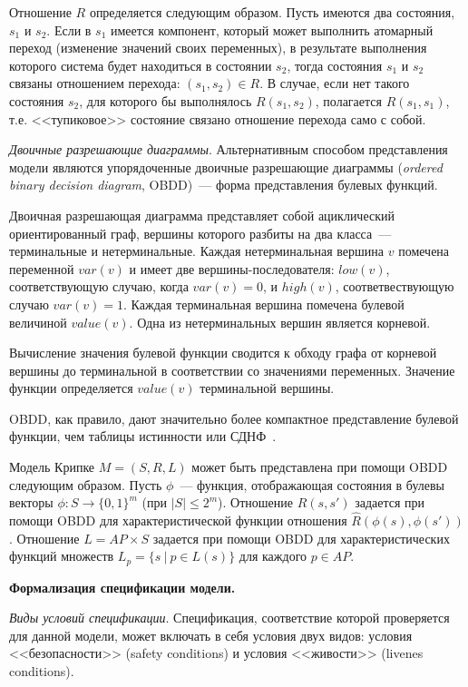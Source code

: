 \documentclass[a4paper,notitlepage,14pt]{article}
\begin{document}
Отношение $R$ определяется следующим образом. Пусть имеются два состояния, $s_1$ и
$s_2$. Если в $s_1$ имеется компонент, который может выполнить атомарный переход
(изменение значений своих переменных), в результате выполнения которого система будет
находиться в состоянии $s_2$, тогда состояния $s_1$ и $s_2$ связаны отношением перехода:
$(s_1, s_2) \in R$. В случае, если нет такого состояния $s_2$, для которого бы выполнялось
$R(s_1, s_2)$, полагается $R(s_1, s_1)$, т.е. <<тупиковое>> состояние связано отношение
перехода само с собой.

\textit{Двоичные разрешающие диаграммы}. Альтернативным способом представления модели
являются упорядоченные двоичные разрешающие диаграммы (\emph{ordered binary decision
  diagram}, OBDD)\cite{Clarke}~--- форма представления булевых функций.

Двоичная разрешающая диаграмма представляет собой ациклический ориентированный граф,
вершины которого разбиты на два класса~--- терминальные и нетерминальные. Каждая
нетерминальная вершина $v$ помечена переменной $var(v)$ и имеет две вершины-последователя:
$low(v)$, соответствующую случаю, когда $var(v) = 0$, и $high(v)$, соответвествующую
случаю $var(v) = 1$. Каждая терминальная вершина помечена булевой величиной
$value(v)$. Одна из нетерминальных вершин является корневой.

Вычисление значения булевой функции сводится к обходу графа от корневой вершины до
терминальной в соответствии со значениями переменных. Значение функции определяется
$value(v)$ терминальной вершины. 

OBDD, как правило, дают значительно более компактное представление булевой функции, чем
таблицы истинности или СДНФ~\cite{Clarke}.

Модель Крипке $M = (S, R, L)$ может быть представлена при помощи OBDD следующим
образом. Пусть $\phi$~--- функция, отображающая состояния в булевы векторы $\phi: S
\rightarrow \{0, 1\}^m$ (при $|S| \leq 2^m$). Отношение $R(s, s')$ задается при помощи
OBDD для характеристической функции отношения $\widehat{R}(\phi(s), \phi(s'))$. Отношение
$L = AP \times S$ задается при помощи OBDD для характеристических функций множеств $L_p =
\{s~|~p \in L(s) \}$ для каждого $p \in AP$.

\textbf{Формализация спецификации модели.}

\textit{Виды условий спецификации}. Спецификация, соответствие которой проверяется для
данной модели, может включать в себя условия двух видов: условия <<безопасности>> (safety
conditions) и условия <<живости>> (livenes conditions).
\end{document}

